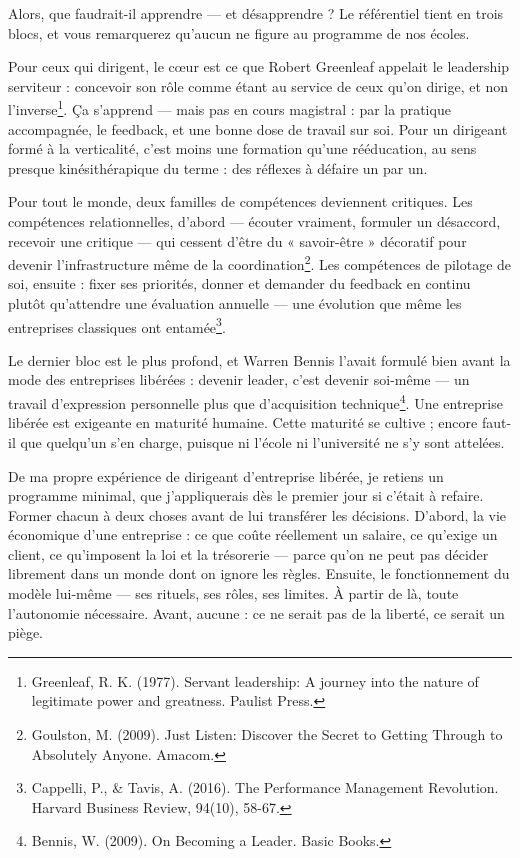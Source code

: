 Alors, que faudrait-il apprendre — et désapprendre ? Le référentiel tient en trois blocs, et vous remarquerez qu'aucun ne figure au programme de nos écoles.

Pour ceux qui dirigent, le cœur est ce que Robert Greenleaf appelait le leadership serviteur : concevoir son rôle comme étant au service de ceux qu'on dirige, et non l'inverse\footnote{Greenleaf, R. K. (1977). Servant leadership: A journey into the nature of legitimate power and greatness. Paulist Press.}. Ça s'apprend — mais pas en cours magistral : par la pratique accompagnée, le feedback, et une bonne dose de travail sur soi. Pour un dirigeant formé à la verticalité, c'est moins une formation qu'une rééducation, au sens presque kinésithérapique du terme : des réflexes à défaire un par un.

Pour tout le monde, deux familles de compétences deviennent critiques. Les compétences relationnelles, d'abord — écouter vraiment, formuler un désaccord, recevoir une critique — qui cessent d'être du « savoir-être » décoratif pour devenir l'infrastructure même de la coordination\footnote{Goulston, M. (2009). Just Listen: Discover the Secret to Getting Through to Absolutely Anyone. Amacom.}. Les compétences de pilotage de soi, ensuite : fixer ses priorités, donner et demander du feedback en continu plutôt qu'attendre une évaluation annuelle — une évolution que même les entreprises classiques ont entamée\footnote{Cappelli, P., \& Tavis, A. (2016). The Performance Management Revolution. Harvard Business Review, 94(10), 58-67.}.

Le dernier bloc est le plus profond, et Warren Bennis l'avait formulé bien avant la mode des entreprises libérées : devenir leader, c'est devenir soi-même — un travail d'expression personnelle plus que d'acquisition technique\footnote{Bennis, W. (2009). On Becoming a Leader. Basic Books.}. Une entreprise libérée est exigeante en maturité humaine. Cette maturité se cultive ; encore faut-il que quelqu'un s'en charge, puisque ni l'école ni l'université ne s'y sont attelées.

De ma propre expérience de dirigeant d'entreprise libérée, je retiens un programme minimal, que j'appliquerais dès le premier jour si c'était à refaire. Former chacun à deux choses avant de lui transférer les décisions. D'abord, la vie économique d'une entreprise : ce que coûte réellement un salaire, ce qu'exige un client, ce qu'imposent la loi et la trésorerie — parce qu'on ne peut pas décider librement dans un monde dont on ignore les règles. Ensuite, le fonctionnement du modèle lui-même — ses rituels, ses rôles, ses limites. À partir de là, toute l'autonomie nécessaire. Avant, aucune : ce ne serait pas de la liberté, ce serait un piège.

